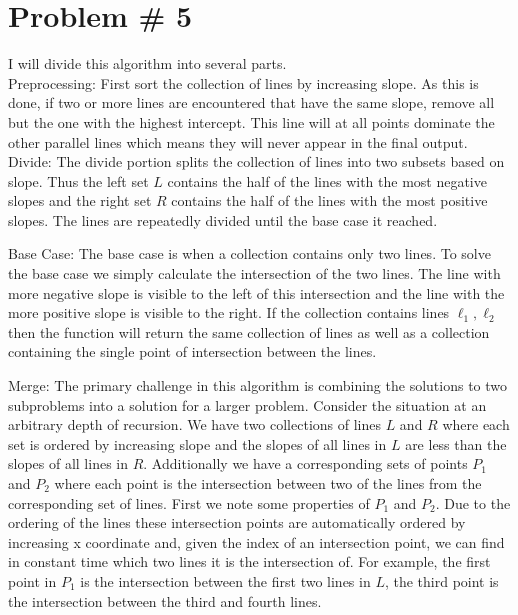\documentclass{article}
\begin{document}
\section*{Problem \# 5}
I will divide this algorithm into several parts.\\

Preprocessing: First sort the collection of lines by increasing slope. As this is done, if two or more lines are encountered that have the same slope, remove all but the one with the highest intercept. This line will at all points dominate the other parallel lines which means they will never appear in the final output.\\

Divide: The divide portion splits the collection of lines into two subsets based on slope. Thus the left set $L$ contains the half of the lines with the most negative slopes and the right set $R$ contains the half of the lines with the most positive slopes. The lines are repeatedly divided until the base case it reached. 

Base Case: The base case is when a collection contains only two lines. To solve the base case we simply calculate the intersection of the two lines. The line with more negative slope is visible to the left of this intersection and the line with the more positive slope is visible to the right. If the collection contains lines $\ell_1, \ell_2$ then the function will return the same collection of lines as well as a collection containing the single point of intersection between the lines.

Merge: The primary challenge in this algorithm is combining the solutions to two subproblems into a solution for a larger problem. Consider the situation at an arbitrary depth of recursion. We have two collections of lines $L$ and $R$ where each set is ordered by increasing slope and the slopes of all lines in $L$ are less than the slopes of all lines in $R$. Additionally we have a corresponding sets of points $P_1$ and $P_2$ where each point is the intersection between two of the lines from the corresponding set of lines. First we note some properties of $P_1$ and $P_2$. Due to the ordering of the lines these intersection points are automatically ordered by increasing x coordinate and, given the index of an intersection point, we can find in constant time which two lines it is the intersection of. For example, the first point in $P_1$ is the intersection between the first two lines in $L$, the third point is the intersection between the third and fourth lines.\\
\end{document}
